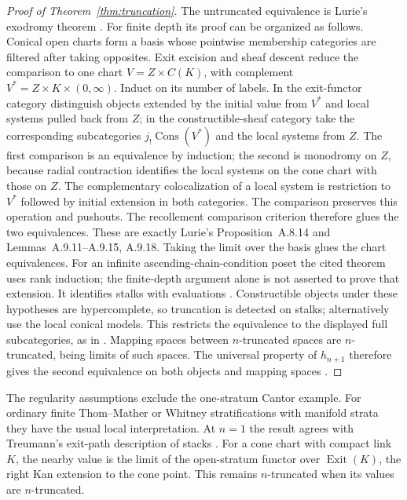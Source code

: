 \documentclass[11pt,a4paper]{article}
\theoremstyle{definition}
\begin{document}
\begin{proof}[Proof of Theorem~\ref{thm:truncation}]
The untruncated equivalence is Lurie's exodromy theorem
\cite[Theorem~A.9.3, p.~1457]{Lurie}. For finite depth its proof can
be organized as follows. Conical open charts form a basis whose
pointwise membership categories are filtered after taking opposites.
Exit excision and sheaf descent reduce the comparison to one chart
$V=Z\times C(K)$, with complement $V^*=Z\times K\times(0,\infty)$.
Induct on its number of labels. In the exit-functor category distinguish
objects extended by the initial value from $V^*$ and local systems
pulled back from $Z$; in the constructible-sheaf category take the
corresponding subcategories $j_!\operatorname{Cons}(V^*)$ and the local
systems from $Z$. The first comparison is an equivalence by induction;
the second is monodromy on $Z$, because radial contraction identifies
the local systems on the cone chart with those on $Z$.
The complementary colocalization of a local system is restriction to
$V^*$ followed by initial extension in both categories. The comparison
preserves this operation and pushouts. The recollement comparison
criterion therefore glues the two equivalences. These are exactly
Lurie's Proposition~A.8.14 and Lemmas~A.9.11--A.9.15, A.9.18.
Taking the limit over the basis glues the chart equivalences. For an
infinite ascending-chain-condition poset the cited theorem uses rank
induction; the finite-depth argument alone is not asserted to prove
that extension. It identifies stalks with
evaluations \cite[Proposition~A.9.16]{Lurie}. Constructible objects
under these hypotheses are hypercomplete, so truncation is detected
on stalks; alternatively use the local conical models. This restricts
the equivalence to the displayed full subcategories, as in
\cite[Remark~A.9.7]{Lurie}. Mapping spaces between $n$-truncated
spaces are $n$-truncated, being limits of such spaces. The universal
property of $h_{n+1}$ therefore gives the second equivalence on both
objects and mapping spaces
\cite[Propositions~2.3.4.12(4) and~2.3.4.18, pp.~110--113]{HTT}.
\end{proof}
The regularity assumptions exclude the one-stratum Cantor example.
For ordinary finite Thom--Mather or Whitney stratifications with
manifold strata they have the usual local interpretation. At $n=1$
the result agrees with Treumann's exit-path description of stacks
\cite[Theorems~7.13--7.14]{Treumann}. For a cone chart with compact
link $K$, the nearby value is the limit of the open-stratum functor
over $\operatorname{Exit}(K)$, the right Kan extension to the cone
point. This remains $n$-truncated when its values are $n$-truncated.
\end{document}
